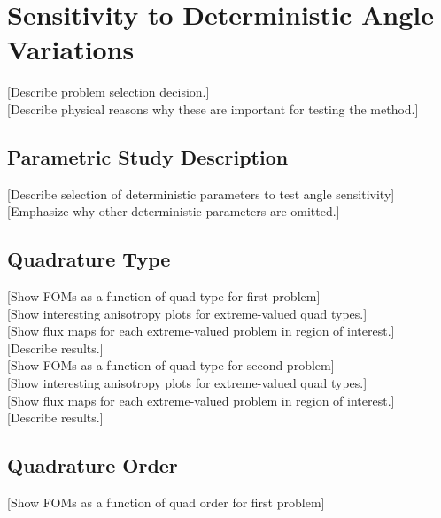\section{Sensitivity to Deterministic Angle Variations}
\label{sec:DetAngle}
[Describe problem selection decision.] \\

[Describe physical reasons why these are important for testing the method.] \\

\subsection{Parametric Study Description}
\label{subsec:parstudy}

[Describe selection of deterministic parameters to test angle sensitivity] \\

[Emphasize why other deterministic parameters are omitted.] \\

\subsection{Quadrature Type}
\label{subsec:quadtype}

[Show FOMs as a function of quad type for first problem] \\

[Show interesting anisotropy plots for extreme-valued quad types.] \\

[Show flux maps for each extreme-valued problem in region of interest.] \\

[Describe results.] \\

[Show FOMs as a function of quad type for second problem] \\

[Show interesting anisotropy plots for extreme-valued quad types.] \\

[Show flux maps for each extreme-valued problem in region of interest.] \\

[Describe results.] \\

\subsection{Quadrature Order}
\label{subsec:quadorder}
[Show FOMs as a function of quad order for first problem] \\


